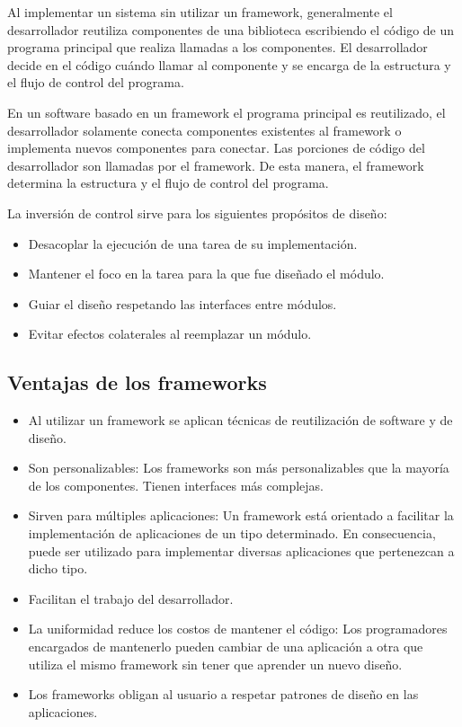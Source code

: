 Al implementar un sistema sin utilizar un framework, generalmente el
desarrollador reutiliza componentes de una biblioteca escribiendo el código de
un programa principal que realiza llamadas a los componentes. El desarrollador
decide en el código cuándo llamar al componente y se encarga de la estructura y
el flujo de control del programa.

En un software basado en un framework el programa principal es reutilizado, el
desarrollador solamente conecta componentes existentes al framework o
implementa nuevos componentes para conectar. Las porciones de código del
desarrollador son llamadas por el framework. De esta manera, el framework
determina la estructura y el flujo de control del programa.

La inversión de control sirve para los siguientes propósitos de diseño:
\begin{itemize}
  \item Desacoplar la ejecución de una tarea de su implementación.
  \item Mantener el foco en la tarea para la que fue diseñado el módulo.
  \item Guiar el diseño respetando las interfaces entre módulos.
  \item Evitar efectos colaterales al reemplazar un módulo.
\end{itemize}

\subsection {Ventajas de los frameworks}
\begin{itemize}
	\item Al utilizar un framework se aplican técnicas de reutilización de
	software y de diseño.
	
	\item Son personalizables: Los frameworks son más
	personalizables que la mayoría de los componentes. Tienen interfaces más
	complejas.
	
	\item Sirven para múltiples aplicaciones: Un framework está orientado a
	facilitar la implementación de aplicaciones de un tipo determinado. En
	consecuencia, puede ser utilizado para implementar diversas aplicaciones que
	pertenezcan a dicho tipo.
	
	\item Facilitan el trabajo del desarrollador.
	
	\item La uniformidad reduce los costos de mantener el código: Los programadores
	encargados de mantenerlo pueden cambiar de una aplicación a otra que utiliza el
	mismo framework sin tener que aprender un nuevo diseño.
	
	\item Los frameworks obligan al usuario a respetar patrones de diseño en las
	aplicaciones.

\end{itemize}

